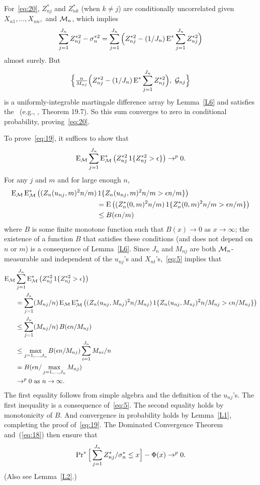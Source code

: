 \documentclass[11pt]{article}
\begin{document}
{For~\eqref{eq:20}, $Z_{nj}^*$ and $Z_{nk}^*$ (when $k \neq j$) are
conditionally uncorrelated given $X_{n1},\dots,X_{nn},$ and $\mathcal{M}_n$, which
implies
\begin{equation*}
  \sum_{j=1}^{J_n} Z_{nj}^{*2} - \sigma_n^{*2} =
  \sum_{j=1}^{J_n} \Big( Z_{nj}^{*2} - (1/J_n) \operatorname{E}^* \sum_{j=1}^{J_n} Z_{nj}^{*2} \Big)
\end{equation*}
almost surely. But
\begin{equation*}
   \Big\{\tfrac{n}{M_{nj}} \Big(Z_{nj}^{*2} - (1/J_n) \operatorname{E}^* \sum_{j=1}^{J_n} Z_{nj}^{*2}\Big),
   \ \mathcal{G}_{nj} \Big\}
\end{equation*}
is a uniformly-integrable martingale difference array
by Lemma~\ref{L6}
and satisfies the \lln\ (e.g., \citealp{Dav:94}, Theorem 19.7). So
this sum converges to zero in conditional probability, proving~\eqref{eq:20}.

To prove~\eqref{eq:19}, it suffices to show that
\begin{equation}\label{eq:21}
  \operatorname{E}_{\mathcal{M}} \sum_{j=1}^{J_n} \operatorname{E}_{\mathcal{M}}^{*}\big(Z_{nj}^{*2} \operatorname{1}\{Z_{nj}^{*2} > \epsilon\}\big) \to^p 0.
\end{equation}
For any $j$ and $m$ and for large enough $n$,
\begin{align}
\operatorname{E}_{\mathcal{M}} \operatorname{E}_{\mathcal{M}}^{*}\big((Z_n(u_{nj}, m)^2n/m) &\operatorname{1}\{Z_n(u_{nj}, m)^2n/m > \epsilon n/m\}\big) \notag \\
&= \operatorname{E} \big((Z_n^{*}(0, m)^2n/m) \operatorname{1}\{Z_n^{*}(0, m)^2n/m > \epsilon n/m\}\big) \notag \\
&\leq B(\epsilon n/m)\label{eq:5}
\end{align}
where $B$ is some finite monotone function such that $B(x) \to 0$ as
$x \to \infty$; the existence of a function $B$ that satisfies these
conditions (and does not depend on $n$ or $m$) is a consequence of
Lemma~\ref{L6}. Since $J_n$ and $M_{nj}$ are both $\mathcal{M}_n$-measurable
and independent of the $u_{nj}$'s and $X_{nt}$'s,~\eqref{eq:5} implies that
\begin{align*}
\operatorname{E}_{\mathcal{M}} &\sum_{j=1}^{J_n} \operatorname{E}_{\mathcal{M}}^{*}\big(Z_{nj}^{*2} \operatorname{1}\{Z_{nj}^{*2} > \epsilon\}\big) \\
& = \sum_{j=1}^{J_n} (M_{nj}/n) \operatorname{E}_{\mathcal{M}} \operatorname{E}_{\mathcal{M}}^{*}
\big((Z_n(u_{nj}, M_{nj})^2 n/M_{nj})
\operatorname{1}\{Z_n(u_{nj}, M_{nj})^2n/M_{nj} > \epsilon n/M_{nj}\}\big) \\
& \leq \sum_{j=1}^{J_n} (M_{nj}/n) \, B(\epsilon n/M_{nj}) \\
& \leq \max_{j = 1,\dots,J_n} B(\epsilon n / M_{nj}) \sum_{i=1}^{J_n} M_{ni} / n \\
& = B(\epsilon n / \max_{j = 1,\dots,J_n} M_{nj}) \\
& \to^p 0 \text{\ as\ } n \to \infty.
\end{align*}
The first equality follows from simple algebra and the definition
of the $u_{nj}$'s. The first inequality is a
consequence of~\eqref{eq:5}.  The second equality holds by
monotonicity of $B$. And convergence in probability holds by
Lemma~\ref{L1}, completing the proof
of~\eqref{eq:19}. The Dominated Convergence Theorem and~(\ref{eq:18})
then ensure that
\begin{equation}\label{eq:22}
  \operatorname{Pr}^{*} \Big[\sum_{j=1}^{J_n}
  Z_{nj}^{*} / \sigma_n^* \leq x \Big] - \Phi(x) \to^p 0.
\end{equation}
(Also see
Lemma~\ref{L2}.)

}
\end{document}
